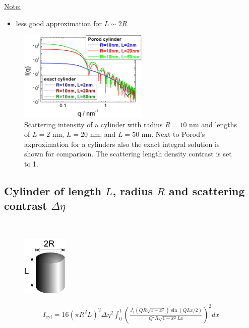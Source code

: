 \underline{Note:}
\begin{itemize}
\item less good approximation  for $L \sim 2R$
\end{itemize}

\begin{figure}[htb]
\begin{center}
\includegraphics[width=0.55\textwidth,height=0.4\textwidth]{../images/form_factor/cylindrical_obj/PorodCylinder.png}
\end{center}
\caption{Scattering intensity of a cylinder with radius $R=10$ nm and lengths of $L=2$ nm,
$L=20$ nm, and $L=50$ nm. Next to Porod's axproximation for a cylinders also
the exact integral solution is shown for comparison.
The scattering length density contrast is set to 1.}
\label{fig:PorodCylinder}
\end{figure}

\clearpage
\subsection{Cylinder of length $L$, radius $R$ and scattering
contrast $\Delta\eta$}
\label{sect:Cylinder}
~\\

\begin{figure}[htb]
\begin{center}
\includegraphics[width=0.192\textwidth,height=0.257\textwidth]{../images/form_factor/cylindrical_obj/cylinder.png}
\end{center}
\caption{} \label{cylinder}
\end{figure}
\begin{align}
I_\text{cyl} = 16 (\pi R^2 L)^2 \Delta\eta^2 \int_0^1 \left(
\frac{J_1\left(Q R \sqrt{1-x^2}\right)
                         \sin(Q L x/2)}{Q^2 R \sqrt{1-x^2} L x}
                      \right)^2 dx
\end{align}
\vspace{5mm}

